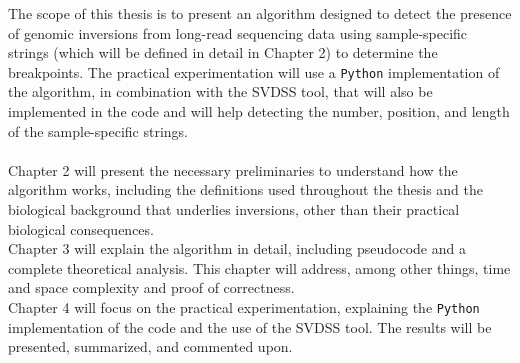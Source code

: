 The scope of this thesis is to present an algorithm designed to detect the presence of genomic inversions from long-read sequencing data using sample-specific strings (which will be defined in detail in Chapter 2) to determine the breakpoints. The practical experimentation will use a \texttt{Python} implementation of the algorithm, in combination with the SVDSS \cite{denti_svdss_2023} tool, that will also be implemented in the code and will help detecting the number, position, and length of the sample-specific strings. \\
\\
Chapter 2 will present the necessary preliminaries to understand how the algorithm works, including the definitions used throughout the thesis and the biological background that underlies inversions, other than their practical biological consequences. \\
Chapter 3 will explain the algorithm in detail, including pseudocode and a complete theoretical analysis. This chapter will address, among other things, time and space complexity and proof of correctness.\\
Chapter 4 will focus on the practical experimentation, explaining the \texttt{Python} implementation of the code and the use of the SVDSS tool. The results will be presented, summarized, and commented upon.

\bigskip
\bigskip

